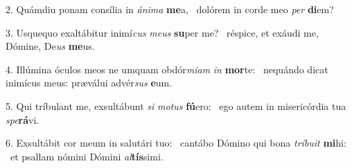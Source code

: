 2. Quámdiu ponam consília in \textit{á}\textit{ni}\textit{ma} \textbf{me}a, \ast\  dolórem in corde meo \textit{per} \textbf{di}em?\

3. Usquequo exaltábitur inimí\textit{cus} \textit{me}\textit{us} \textbf{su}per me? \ast\  réspice, et exáudi me, Dómine, De\textit{us} \textbf{me}us.\

4. Illúmina óculos meos ne umquam obdór\textit{mi}\textit{am} \textit{in} \textbf{mor}te: \ast\  nequándo dicat inimícus meus: præválui advér\textit{sus} \textbf{e}um.\

5. Qui tríbulant me, exsultábunt \textit{si} \textit{mo}\textit{tus} \textbf{fú}ero: \ast\  ego autem in misericórdia tua \textit{spe}\textbf{rá}vi.\

6. Exsultábit cor meum in salutári tuo: \dag\  cantábo Dómino qui bona \textit{trí}\textit{bu}\textit{it} \textbf{mi}hi: \ast\  et psallam nómini Dómini \textit{al}\textbf{tís}simi.\

